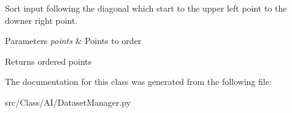 Sort input following the diagonal which start to the upper left point to the downer right point. 


\begin{DoxyParams}{Parameters}
{\em points} & Points to order \\
\hline
\end{DoxyParams}
\begin{DoxyReturn}{Returns}
ordered points 
\end{DoxyReturn}


The documentation for this class was generated from the following file\+:\begin{DoxyCompactItemize}
\item 
src/\+Class/\+A\+I/Dataset\+Manager.\+py\end{DoxyCompactItemize}
